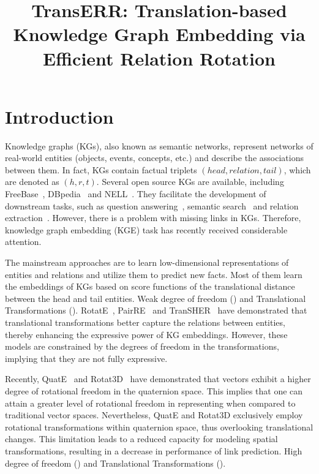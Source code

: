 \documentclass[10pt, a4paper]{article}
\title{TransERR: Translation-based Knowledge Graph Embedding via Efficient Relation Rotation}
\begin{document}
\maketitleabstract

\section{Introduction}
Knowledge graphs (KGs), also known as semantic networks, represent networks of real-world entities (objects, events, concepts, etc.) and describe the associations between them. In fact, KGs contain factual triplets $(head, relation, tail)$, which are denoted as $(h, r, t)$. Several open source KGs are available, including FreeBase~\cite{4bollacker2008freebase}, DBpedia~\cite{45lehmann2015dbpedia} and  NELL~\cite{46mitchell2018never}. They facilitate the development of downstream tasks, such as question answering~\cite{2}, semantic search~\cite{3junior2020knowledge} and relation extraction~\cite{1}. However, there is a problem with missing links in KGs. Therefore,  knowledge graph embedding (KGE) task has recently received considerable attention.

The mainstream approaches are to learn low-dimensional representations of entities and relations and utilize them to predict new facts. Most of them learn the embeddings of KGs based on score functions of the translational distance between the head and tail entities. Weak degree of freedom () and Translational Transformations (). RotatE~\cite{31sun2019rotate}, PairRE~\cite{52chao2020pairre} and TranSHER~\cite{li-etal-2022-transher} have demonstrated that translational transformations better capture the relations between entities, thereby enhancing the expressive power of KG embeddings. However, these models are constrained by the degrees of freedom in the transformations, implying that they are not fully expressive. 


Recently, QuatE~\cite{zhang2019quaternion} and Rotat3D~\cite{15gao2020rotate3d} have demonstrated that vectors exhibit a higher degree of rotational freedom in the quaternion space.  This implies that one can attain a greater level of rotational freedom in representing when compared to traditional vector spaces. Nevertheless, QuatE and Rotat3D exclusively employ rotational transformations within quaternion space, thus overlooking translational changes. This limitation leads to a reduced capacity for modeling spatial transformations, resulting in a decrease in performance of link prediction. High degree of freedom () and Translational Transformations ().
\end{document}
